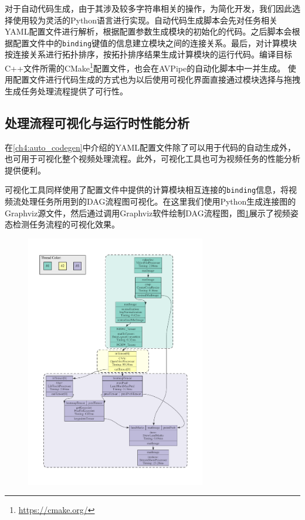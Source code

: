 对于自动代码生成，由于其涉及较多字符串相关的操作，为简化开发，我们因此选择使用较为灵活的Python语言进行实现。自动代码生成脚本会先对任务相关YAML配置文件进行解析，根据配置参数生成模块的初始化的代码。之后脚本会根据配置文件中的\texttt{binding}键值的信息建立模块之间的连接关系。最后，对计算模块按连接关系进行拓扑排序，按拓扑排序结果生成计算模块的运行代码。编译目标C++文件所需的CMake\footnote{\url{https://cmake.org/}}配置文件，也会在AVPipe的自动化脚本中一并生成。
使用配置文件进行代码生成的方式也为以后使用可视化界面直接通过模块选择与拖拽生成任务处理流程提供了可行性。

\subsection{处理流程可视化与运行时性能分析}\label{ch4:viz_prof}
在\ref{ch4:auto_codegen}中介绍的YAML配置文件除了可以用于代码的自动生成外，也可用于可视化整个视频处理流程。此外，可视化工具也可为视频任务的性能分析提供便利。\par

可视化工具同样使用了配置文件中提供的计算模块相互连接的\texttt{binding}信息，将视频流处理任务所用到的DAG流程图可视化。在这里我们使用Python生成连接图的Graphviz\cite{Gansner00anopen}源文件，然后通过调用Graphviz软件绘制DAG流程图，图\ref{fig:pose_dag}展示了视频姿态检测任务流程的可视化效果。\par

\begin{figure}[tb]
    \centering
    \includegraphics[width=0.7\textwidth]{figure/AVP_pose_estimation.pdf}
    \label{fig:pose_dag}
\end{figure}

